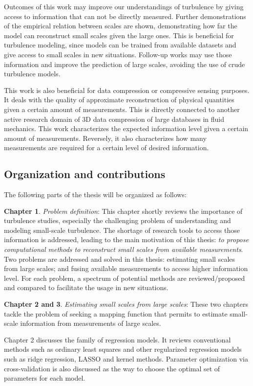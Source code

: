 Outcomes of this work may improve our understandings of turbulence by giving access to information that can not be directly measured. Further demonstrations of the empirical relation between scales are shown, demonstrating how far the model can reconstruct small scales given the large ones. This is beneficial for turbulence modeling, since models can be trained from available datasets and give access to small scales in new situations. Follow-up works may use those information and improve the prediction of large scales, avoiding the use of crude turbulence models.

This work is also beneficial for data compression or compressive sensing purposes. It deals with the quality of approximate reconstruction of physical quantities given a certain amount of measurements. This is directly connected to another active research domain of 3D data compression of large databases in fluid mechanics. This work characterizes the expected information level given a certain amount of measurements. Reversely, it also characterizes how many measurements are required for a certain level of desired information.
 
\subsection{Organization and contributions} 
The following parts of the thesis will be organized as follows:

\textbf{Chapter 1}. \textit{Problem definition}: This chapter shortly reviews the importance of turbulence studies, especially the challenging problem of understanding and modeling small-scale turbulence. The shortage of research tools to access those information is addressed, leading to the main motivation of this thesis: \textit{to propose computational methods to reconstruct small scales from available measurements}. Two problems are addressed and solved in this thesis: estimating small scales from large scales; and fusing available measurements to access higher information level. For each problem, a spectrum of potential methods are reviewed/proposed and compared to facilitate the usage in new situations.
	
\textbf{Chapter 2 and 3}. \textit{Estimating small scales from large scales}: These two chapters tackle the problem of seeking a mapping function that permits to estimate small-scale information from measurements of large scales. 

Chapter 2 discusses the family of regression models. It reviews conventional methods such as ordinary least squares and other regularized regression models such as ridge regression, LASSO and kernel methods. Parameter optimization via cross-validation is also discussed as the way to choose the optimal set of parameters for each model.

